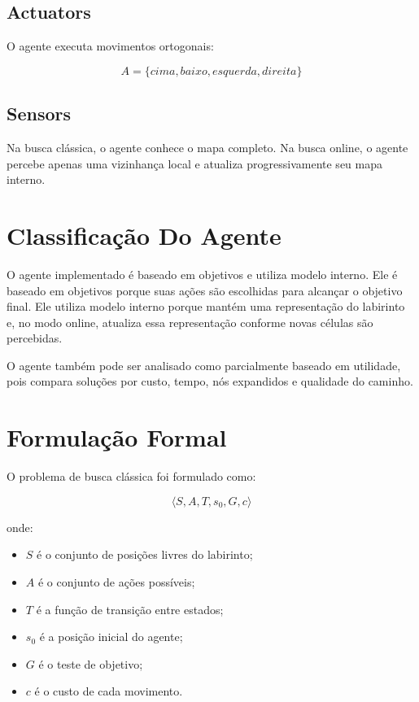 \documentclass[12pt,a4paper]{article}
\begin{document}
\subsection{Actuators}

O agente executa movimentos ortogonais:

\[
A = \{cima, baixo, esquerda, direita\}
\]

\subsection{Sensors}

Na busca clássica, o agente conhece o mapa completo. Na busca online, o agente percebe apenas uma vizinhança local e atualiza progressivamente seu mapa interno.

\section{Classificação Do Agente}

O agente implementado é baseado em objetivos e utiliza modelo interno. Ele é baseado em objetivos porque suas ações são escolhidas para alcançar o objetivo final. Ele utiliza modelo interno porque mantém uma representação do labirinto e, no modo online, atualiza essa representação conforme novas células são percebidas.

O agente também pode ser analisado como parcialmente baseado em utilidade, pois compara soluções por custo, tempo, nós expandidos e qualidade do caminho.

\section{Formulação Formal}

O problema de busca clássica foi formulado como:

\[
\langle S, A, T, s_0, G, c \rangle
\]

onde:

\begin{itemize}
    \item $S$ é o conjunto de posições livres do labirinto;
    \item $A$ é o conjunto de ações possíveis;
    \item $T$ é a função de transição entre estados;
    \item $s_0$ é a posição inicial do agente;
    \item $G$ é o teste de objetivo;
    \item $c$ é o custo de cada movimento.
\end{itemize}
\end{document}
